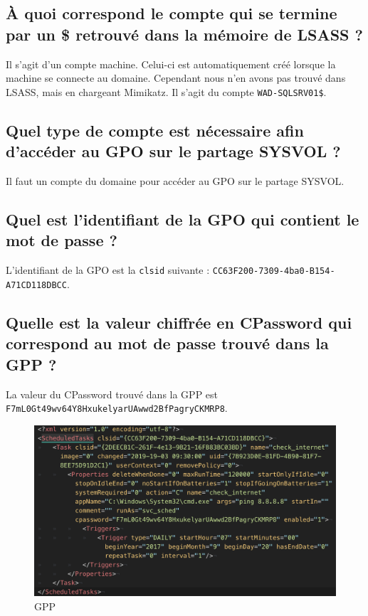 \documentclass{extarticle} %
\begin{document}
    \subsection{À quoi correspond le compte qui se termine par un \$ retrouvé dans la mémoire de LSASS ?}
    Il s'agit d'un compte machine. Celui-ci est automatiquement créé lorsque la machine se connecte au domaine.
    Cependant nous n'en avons pas trouvé dans LSASS, mais en chargeant Mimikatz. Il s'agit du compte \texttt{WAD-SQLSRV01\$}.

    \subsection{Quel type de compte est nécessaire afin d’accéder au GPO sur le partage SYSVOL ?}
    Il faut un compte du domaine pour accéder au GPO sur le partage SYSVOL.

    \subsection{Quel est l’identifiant de la GPO qui contient le mot de passe ?}
    L'identifiant de la GPO est la \texttt{clsid} suivante : \texttt{CC63F200-7309-4ba0-B154-A71CD118DBCC}.

    \subsection{Quelle est la valeur chiffrée en CPassword qui correspond au mot de passe trouvé dans la GPP ?}
    La valeur du CPassword trouvé dans la GPP est \texttt{F7mL0Gt49wv64Y8HxukelyarUAwwd2BfPagryCKMRP8}.

    \begin{figure}[H]
        \centering
        \includegraphics[scale=0.5]{images/cpassword.png}
        \caption{GPP}
    \end{figure}
\end{document}
